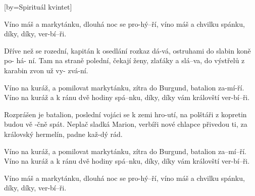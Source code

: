 [by={Spirituál kvintet}]

\beginverse*{}
Víno máš a markytánku, dlouhá noc se pro-hý--ří,
víno máš a chvilku spánku, díky, díky, ver-bí--ři.
\endverse{}

\beginverse{}
Dříve než se rozední, kapitán k osedlání rozkaz dá-vá,
ostruhami do slabin koně po- há- ní.
Tam na straně polední, čekají ženy, zlaťáky a slá--va,
do výstřelů z karabin zvon už vy- zvá-ní.
\endverse{}

\beginchorus{}
Víno na kuráž, a pomilovat markytánku,
zítra do Burgund, batalion za-mí-ří.
Víno na kuráž a k ránu dvě hodiny spá--nku,
díky, díky vám královští ver-bí--ři.
\endchorus{}

\beginverse{}
Rozprášen je batalion, poslední vojáci se k zemi hro-utí,
na polštáři z kopretin budou vě -čně spát.
Neplač sladká Marion, verbíři nové chlapce přivedou ti,
za královský hermelín, padne kaž-dý rád.
\endverse{}

\beginchorus{}
Víno na kuráž, a pomilovat markytánku,
zítra do Burgund, batalion za--mí--ří.
Víno na kuráž a k ránu dvě hodiny spá--nku,
díky, díky vám královští ver-bí--ři.
\endchorus{}

\beginverse*{}
Víno máš a markytánku, dlouhá noc se pro-hý--ří,
víno máš a chvilku spánku, díky, díky, ver-bí--ři.
\endverse{}

\endsong{}
